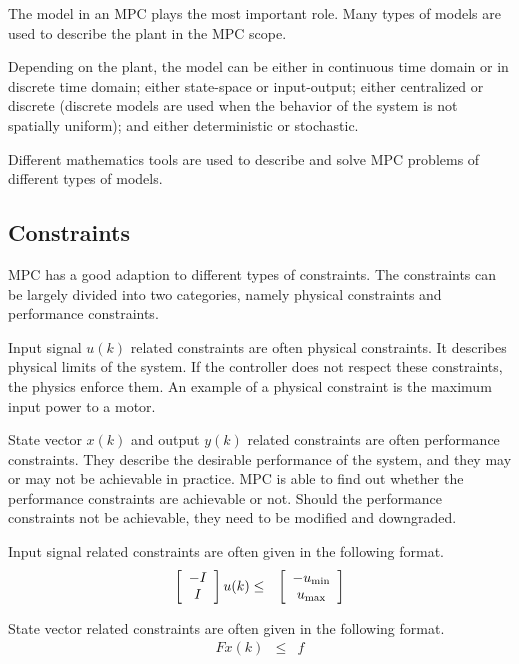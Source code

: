 The model in an MPC plays the most important role. Many types of models are used to describe the plant in the MPC scope.

Depending on the plant, the model can be either in continuous time domain or in discrete time domain; either state-space or input-output; either centralized or discrete (discrete models are used when the behavior of the system is not spatially uniform); and either deterministic or stochastic.

Different mathematics tools are used to describe and solve MPC problems of different types of models.

\subsection{Constraints}

MPC has a good adaption to different types of constraints. The constraints can be largely divided into two categories, namely physical constraints and performance constraints.

Input signal $u(k)$ related constraints are often physical constraints. It describes physical limits of the system. If the controller does not respect these constraints, the physics enforce them. An example of a physical constraint is the maximum input power to a motor.

State vector $x(k)$ and output $y(k)$ related constraints are often performance constraints. They describe the desirable performance of the system, and they may or may not be achievable in practice. MPC is able to find out whether the performance constraints are achievable or not. Should the performance constraints not be achievable, they need to be modified and downgraded.

Input signal related constraints are often given in the following format.
\begin{eqnarray}
	\left[\begin{array}{c}
		-I \\ I
	\end{array}\right]u(k) &\leq& \left[\begin{array}{c}
	-u_{\textup{min}} \\ u_{\textup{max}}
\end{array}\right] \nonumber
\end{eqnarray}

State vector related constraints are often given in the following format.
\begin{eqnarray}
	Fx(k) &\leq& f \nonumber
\end{eqnarray}

